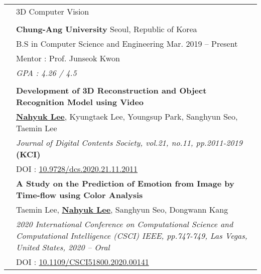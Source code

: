 \documentclass[letterpaper, 11pt]{article}
\begin{document}
\begin{longtable}{p{1.3in}p{4.8in}}


\nohyphens{\color{OliveGreen}{Research interests}}
& 3D Computer Vision \\
& \\


\color{OliveGreen}{Education} 
& \textbf{Chung-Ang University} \hfill Seoul, Republic of Korea \\ 
& B.S in Computer Science and Engineering \hfill Mar. 2019 -- Present \\
& Mentor : Prof. Junseok Kwon  \\
& {\it GPA : 4.26 / 4.5}\\
& \\




\nohyphens{\color{OliveGreen}{Publications}} 

& \textbf{Development of 3D Reconstruction and Object Recognition Model using Video} \\
& \uline{\textbf{Nahyuk Lee}}, Kyungtaek Lee, Youngsup Park, Sanghyun Seo, Taemin Lee  \\
& \textit{Journal of Digital Contents Society, vol.21, no.11, pp.2011-2019} \textbf{(KCI)}\\
& DOI : \href{http://doi.org/10.9728/dcs.2020.21.11.2011}{10.9728/dcs.2020.21.11.2011}
& \\


& \textbf{A Study on the Prediction of Emotion from Image by Time-flow using Color Analysis} \\
& Taemin Lee, \uline{\textbf{Nahyuk Lee}}, Sanghyun Seo, Dongwann Kang \\
& \textit{2020 International Conference on Computational Science and Computational Intelligence (CSCI) IEEE, pp.747-749, Las Vegas, United States, 2020 -- Oral}\\
& DOI : \href{https://doi.org/10.1109/CSCI51800.2020.00141}{10.1109/CSCI51800.2020.00141}
& \\


\end{longtable}
\end{document}
